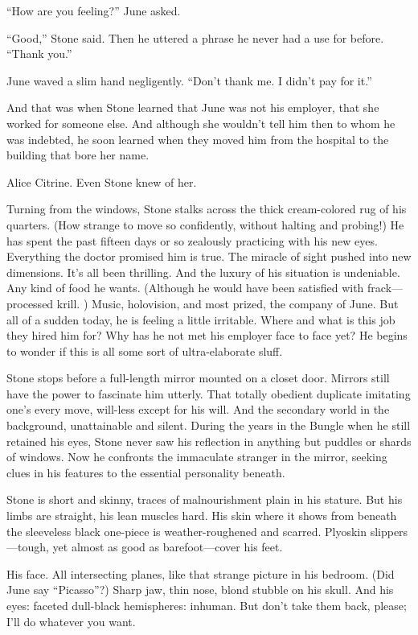 ``How are you feeling?'' June asked.

``Good,'' Stone said. Then he uttered a phrase he never had a use for before. ``Thank you.''

June waved a slim hand negligently. ``Don't thank me. I didn't pay for it.''

And that was when Stone learned that June was not his employer, that she worked for someone else. And although she wouldn't tell him then to whom he was indebted, he soon learned when they moved him from the hospital to the building that bore her name.

Alice Citrine. Even Stone knew of her.

Turning from the windows, Stone stalks across the thick cream-colored rug of his quarters. (How strange to move so confidently, without halting and probing!) He has spent the past fifteen days or so zealously practicing with his new eyes. Everything the doctor promised him is true. The miracle of sight pushed into new dimensions. It's all been thrilling. And the luxury of his situation is undeniable. Any kind of food he wants. (Although he would have been satisfied with frack---processed krill. ) Music, holovision, and most prized, the company of June. But all of a sudden today, he is feeling a little irritable. Where and what is this job they hired him for? Why has he not met his employer face to face yet? He begins to wonder if this is all some sort of ultra-elaborate sluff.

Stone stops before a full-length mirror mounted on a closet door. Mirrors still have the power to fascinate him utterly. That totally obedient duplicate imitating one's every move, will-less except for his will. And the secondary world in the background, unattainable and silent. During the years in the Bungle when he still retained his eyes, Stone never saw his reflection in anything but puddles or shards of windows. Now he confronts the immaculate stranger in the mirror, seeking clues in his features to the essential personality beneath.

Stone is short and skinny, traces of malnourishment plain in his stature. But his limbs are straight, his lean muscles hard. His skin where it shows from beneath the sleeveless black one-piece is weather-roughened and scarred. Plyoskin slippers---tough, yet almost as good as barefoot---cover his feet.

His face. All intersecting planes, like that strange picture in his bedroom. (Did June say ``Picasso''?) Sharp jaw, thin nose, blond stubble on his skull. And his eyes: faceted dull-black hemispheres: inhuman. But don't take them back, please; I'll do whatever you want.

